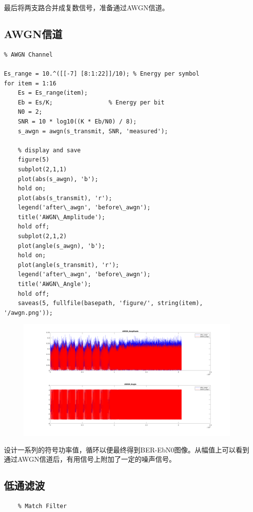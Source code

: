 \begin{spacing}{1.5}
最后将两支路合并成复数信号，准备通过AWGN信道。

\subsection{AWGN信道}

\begin{lstlisting}
% AWGN Channel

Es_range = 10.^([[-7] [8:1:22]]/10); % Energy per symbol
for item = 1:16
    Es = Es_range(item);
    Eb = Es/K;                % Energy per bit
    N0 = 2;
    SNR = 10 * log10((K * Eb/N0) / 8);
    s_awgn = awgn(s_transmit, SNR, 'measured');
    
    % display and save
    figure(5)
    subplot(2,1,1)
    plot(abs(s_awgn), 'b');
    hold on;
    plot(abs(s_transmit), 'r');
    legend('after\_awgn', 'before\_awgn');
    title('AWGN\_Amplitude');
    hold off;
    subplot(2,1,2)
    plot(angle(s_awgn), 'b');
    hold on;
    plot(angle(s_transmit), 'r');
    legend('after\_awgn', 'before\_awgn');
    title('AWGN\_Angle');
    hold off;
    saveas(5, fullfile(basepath, 'figure/', string(item), '/awgn.png'));
\end{lstlisting}

\begin{figure}[H]
\centering
\includegraphics[width = \columnwidth]{awgn.png}
\end{figure}

设计一系列的符号功率值，循环以便最终得到BER-EbN0图像。从幅值上可以看到通过AWGN信道后，有用信号上附加了一定的噪声信号。

\subsection{低通滤波}

\begin{lstlisting}
    % Match Filter


\end{lstlisting}
\end{spacing}
